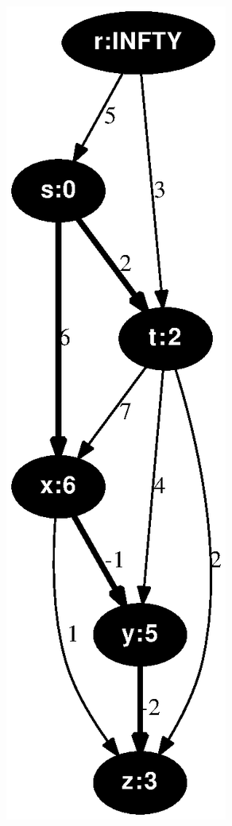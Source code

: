 \documentclass{article}
\begin{document}
\includegraphics[height=.3\textheight]{dag_shortest_path_06.eps}
\end{document}
